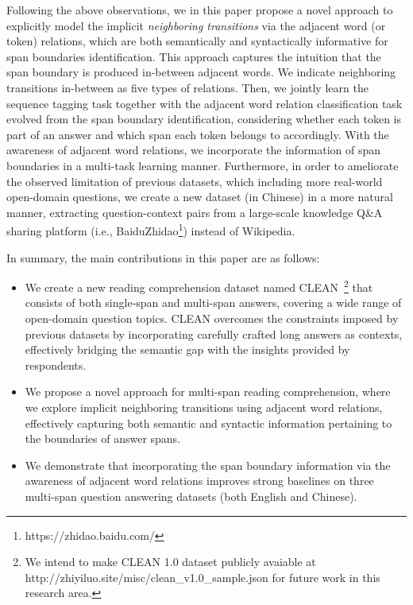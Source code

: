 \documentclass[a4paper]{cas-sc}
\newcommand{\1}[1]{\mathds{1}\left[#1\right]}
\begin{document}
Following the above observations, we in this paper propose a novel approach to explicitly model the implicit \emph{neighboring transitions} 
via the adjacent word (or token) relations, 
which are both semantically and syntactically informative for span boundaries identification. 
This approach captures the intuition that the span boundary is produced in-between adjacent words. 
We indicate neighboring transitions in-between
as five types of relations.
Then, we jointly learn the sequence tagging task 
together with the  adjacent word relation classification task 
evolved from the span boundary identification, 
considering whether each token is part of an answer 
and which span each token belongs to accordingly. 
With the awareness of adjacent word relations, 
we incorporate the information of span boundaries in a multi-task learning manner.
Furthermore, in order to ameliorate the observed limitation of previous datasets, 
which including more real-world open-domain questions, 
we create a new dataset (in Chinese) in a more natural manner, 
extracting question-context pairs from a large-scale knowledge Q\&A sharing platform (i.e., BaiduZhidao\footnote{https://zhidao.baidu.com/}) instead of Wikipedia. 


In summary, the main contributions in this paper are as follows:
\begin{itemize}
	\item We create a new reading comprehension dataset named CLEAN~\footnote{We intend to make CLEAN 1.0 dataset publicly avaiable at http://zhiyiluo.site/misc/clean\_v1.0\_sample.json for future work in this research area.} that consists of both single-span and multi-span answers, covering a wide range of open-domain question topics. 
	CLEAN overcomes the constraints imposed by previous datasets by incorporating carefully crafted long answers as contexts, effectively bridging the semantic gap with the insights provided by respondents. 
	\item We propose a novel approach for multi-span reading comprehension,  where we explore implicit neighboring transitions using adjacent word relations, effectively capturing both semantic and syntactic information pertaining to the boundaries of answer spans.
	
	\item We demonstrate that incorporating the span boundary information via the awareness of adjacent word relations improves strong baselines on three multi-span question answering datasets (both English and Chinese).
\end{itemize}
\end{document}
